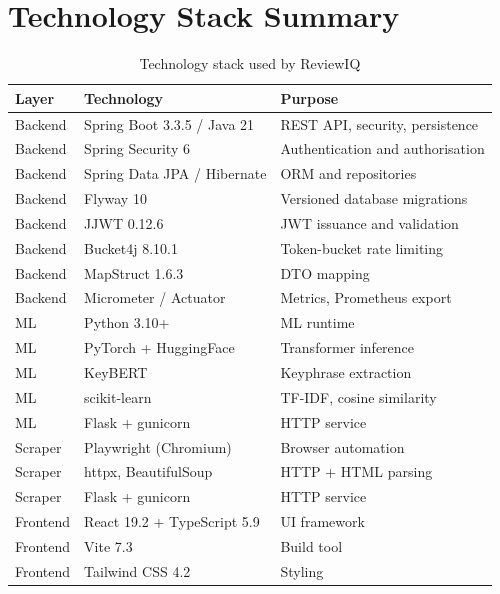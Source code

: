 \documentclass[12pt,a4paper,oneside]{report}
\begin{document}
\section{Technology Stack Summary}

\begin{table}[ht]
\centering
\caption{Technology stack used by ReviewIQ}
\label{tab:stack}
\begin{tabularx}{\textwidth}{l l X}
\toprule
\textbf{Layer} & \textbf{Technology} & \textbf{Purpose} \\
\midrule
Backend   & Spring Boot 3.3.5 / Java 21   & REST API, security, persistence \\
Backend   & Spring Security 6             & Authentication and authorisation \\
Backend   & Spring Data JPA / Hibernate    & ORM and repositories \\
Backend   & Flyway 10                     & Versioned database migrations \\
Backend   & JJWT 0.12.6                   & JWT issuance and validation \\
Backend   & Bucket4j 8.10.1               & Token-bucket rate limiting \\
Backend   & MapStruct 1.6.3               & DTO mapping \\
Backend   & Micrometer / Actuator          & Metrics, Prometheus export \\
ML        & Python 3.10+                   & ML runtime \\
ML        & PyTorch + HuggingFace          & Transformer inference \\
ML        & KeyBERT                        & Keyphrase extraction \\
ML        & scikit-learn                   & TF-IDF, cosine similarity \\
ML        & Flask + gunicorn               & HTTP service \\
Scraper   & Playwright (Chromium)          & Browser automation \\
Scraper   & httpx, BeautifulSoup           & HTTP + HTML parsing \\
Scraper   & Flask + gunicorn               & HTTP service \\
Frontend  & React 19.2 + TypeScript 5.9    & UI framework \\
Frontend  & Vite 7.3                       & Build tool \\
Frontend  & Tailwind CSS 4.2               & Styling \\

\end{tabularx}
\end{table}
\end{document}
